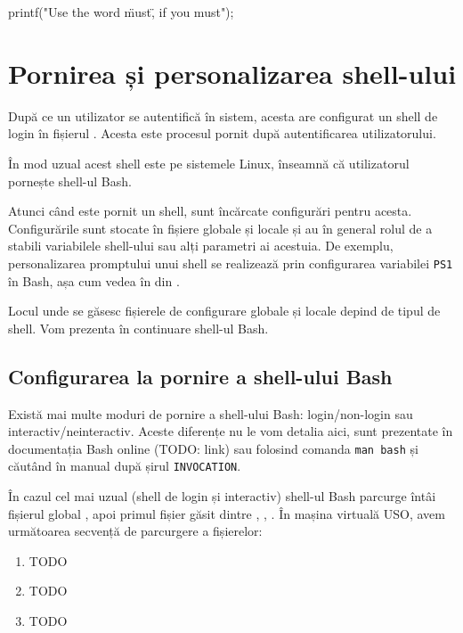 \begin{screen}[caption={Permisiuni pe fișiere cu parole},label={lst:cli:c-escaping}]
printf("Use the word \"must\", if you must\n");
\end{screen}

\section{Pornirea și personalizarea shell-ului}
\label{sec:cli-customize-shell}

După ce un utilizator se autentifică în sistem, acesta are configurat un shell
de login în fișierul . Acesta este procesul pornit după
autentificarea utilizatorului.

În mod uzual acest shell este  pe sistemele Linux, înseamnă că
utilizatorul pornește shell-ul Bash.

Atunci când este pornit un shell, sunt încărcate configurări pentru acesta.
Configurările sunt stocate în fișiere globale și locale și au în general rolul
de a stabili variabilele shell-ului sau alți parametri ai acestuia. De exemplu,
personalizarea promptului unui shell se realizează prin configurarea variabilei
\texttt{PS1} în Bash, așa cum vedea în  din .

Locul unde se găsesc fișierele de configurare globale și locale depind de tipul
de shell. Vom prezenta în continuare shell-ul Bash.

\subsection{Configurarea la pornire a shell-ului Bash}
\label{sec:cli-shell-startup}

Există mai multe moduri de pornire a shell-ului Bash: login/non-login sau
interactiv/neinteractiv. Aceste diferențe nu le vom detalia aici, sunt
prezentate în documentația Bash online (TODO: link) sau folosind comanda \texttt{man bash} și căutând în manual după șirul \texttt{INVOCATION}.

În cazul cel mai uzual (shell de login și interactiv) shell-ul Bash parcurge
întâi fișierul global , apoi primul fișier găsit dintre
, , . În mașina virtuală USO, avem
următoarea secvență de parcurgere a fișierelor:

\begin{enumerate}
  \item TODO
  \item TODO
  \item TODO
\end{enumerate}


